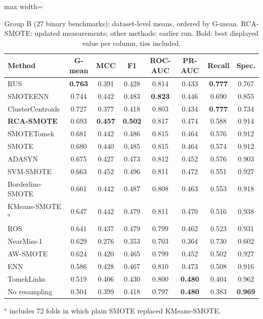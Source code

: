 \documentclass[preprint,nopreprintline]{elsarticle}
\theoremstyle{plain}
\theoremstyle{definition}
\newcommand{\tabfont}{\fontsize{8}{9.4}\selectfont}
\providecommand{\botrule}{\bottomrule}
\begin{document}
\begin{table}[!htb]
\caption{Group B (27 binary benchmarks): dataset-level means, ordered by G-mean. RCA-SMOTE: updated measurements; other methods: earlier run. Bold: best displayed value per column, ties included.}\label{tab:groupB}
\centering\tabfont
\begin{adjustbox}{max width=\textwidth}
\begin{tabular}{@{}lccccccc@{}}
\toprule
Method & G-mean & MCC & F1 & ROC-AUC & PR-AUC & Recall & Spec. \\
\midrule
RUS & \textbf{0.763} & 0.391 & 0.428 & 0.814 & 0.433 & \textbf{0.777} & 0.767 \\
SMOTEENN & 0.744 & 0.442 & 0.483 & \textbf{0.823} & 0.446 & 0.690 & 0.855 \\
ClusterCentroids & 0.727 & 0.377 & 0.418 & 0.803 & 0.434 & \textbf{0.777} & 0.734 \\
\textbf{RCA-SMOTE} & 0.693 & \textbf{0.457} & \textbf{0.502} & 0.817 & 0.474 & 0.588 & 0.914 \\
SMOTETomek & 0.681 & 0.442 & 0.486 & 0.815 & 0.464 & 0.576 & 0.912 \\
SMOTE & 0.680 & 0.440 & 0.485 & 0.815 & 0.464 & 0.574 & 0.912 \\
ADASYN & 0.675 & 0.427 & 0.473 & 0.812 & 0.452 & 0.576 & 0.903 \\
SVM-SMOTE & 0.663 & 0.452 & 0.496 & 0.811 & 0.472 & 0.551 & 0.927 \\
Borderline-SMOTE & 0.661 & 0.442 & 0.487 & 0.808 & 0.463 & 0.553 & 0.918 \\
KMeans-SMOTE$^{a}$ & 0.647 & 0.442 & 0.479 & 0.811 & 0.470 & 0.516 & 0.938 \\
ROS & 0.641 & 0.437 & 0.479 & 0.799 & 0.462 & 0.523 & 0.931 \\
NearMiss-1 & 0.629 & 0.276 & 0.353 & 0.703 & 0.364 & 0.730 & 0.602 \\
AW-SMOTE & 0.624 & 0.420 & 0.465 & 0.799 & 0.452 & 0.502 & 0.927 \\
ENN & 0.586 & 0.428 & 0.467 & 0.810 & 0.473 & 0.508 & 0.916 \\
TomekLinks & 0.519 & 0.406 & 0.430 & 0.800 & \textbf{0.480} & 0.404 & 0.962 \\
No resampling & 0.504 & 0.399 & 0.418 & 0.797 & \textbf{0.480} & 0.383 & \textbf{0.969} \\
\botrule
\end{tabular}
\end{adjustbox}
\par\smallskip\raggedright\footnotesize $^{a}$ includes 72 folds in which plain SMOTE replaced KMeans-SMOTE.
\end{table}
\end{document}
